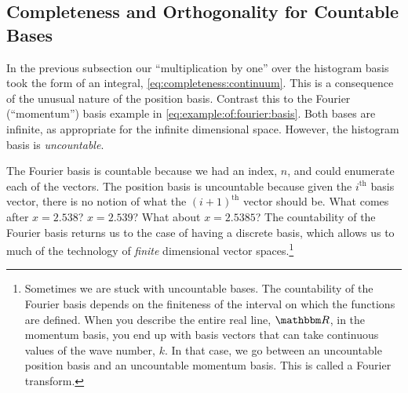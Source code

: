 \subsection{Completeness and Orthogonality for Countable Bases}

In the previous subsection our ``multiplication by one'' over the histogram basis took the form of an integral, \eqref{eq:completeness:continuum}. This is a consequence of the unusual nature of the position basis. Contrast this to the Fourier (``momentum'') basis example in \eqref{eq:example:of:fourier:basis}. Both bases are infinite, as appropriate for the infinite dimensional space. However, the histogram basis is \emph{uncountable}. 

The Fourier basis is countable because we had an index, $n$, and could enumerate each of the vectors. The position basis is uncountable because given the $i^\text{th}$ basis vector, there is no notion of what the $(i+1)^\text{th}$ vector should be. What comes after $x=2.538$? $x=2.539$? What about $x=2.5385$? The countability of the Fourier basis returns us to the case of having a discrete basis, which allows us to much of the technology of \emph{finite} dimensional vector spaces.\footnote{Sometimes we are stuck with uncountable bases. The countability of the Fourier basis depends on the finiteness of the interval on which the functions are defined. When you describe the entire real line, $\RR$, in the momentum basis, you end up with basis vectors that can take continuous values of the wave number, $k$. In that case, we go between an uncountable position basis and an uncountable momentum basis. This is called a Fourier transform.}

